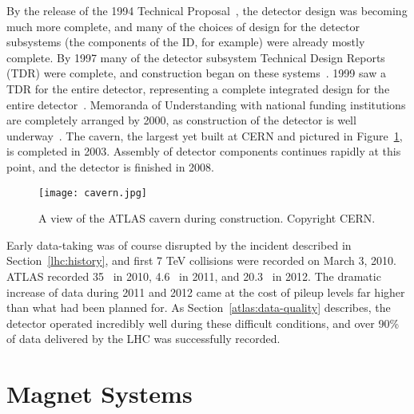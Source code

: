 
By the release of the 1994 Technical Proposal~\cite{ATLASTP}, the detector design was becoming much more complete, and many of the choices of design for the detector subsystems (the components of the ID, for example) were already mostly complete. By 1997 many of the detector subsystem Technical Design Reports (TDR) were complete, and construction began on these systems~\cite{ATLASHistory}. 1999 saw a TDR for the entire detector, representing a complete integrated design for the entire detector~\cite{tdr1,tdr2}. Memoranda of Understanding with national funding institutions are completely arranged by 2000, as construction of the detector is well underway~\cite{ATLASHistory}. The cavern, the largest yet built at CERN and pictured in Figure~\ref{fig:detector:cavern}, is completed in 2003. Assembly of detector components continues rapidly at this point, and the detector is finished in 2008.


\begin{figure}
\centering
\texttt{[image: cavern.jpg]}
\label{fig:detector:cavern}
\caption{A view of the ATLAS cavern during construction. Copyright CERN.}
\end{figure}


Early data-taking was of course disrupted by the incident described in Section~\ref{lhc:history}, and first 7 TeV collisions were recorded on March 3, 2010. ATLAS recorded 35 \ipb~in 2010, 4.6 \ifb~in 2011, and 20.3 \ifb~in 2012. The dramatic increase of data during 2011 and 2012 came at the cost of pileup levels far higher than what had been planned for. As Section~\ref{atlas:data-quality} describes, the detector operated incredibly well during these difficult conditions, and over 90\% of data delivered by the LHC was successfully recorded.











\section{Magnet Systems}


